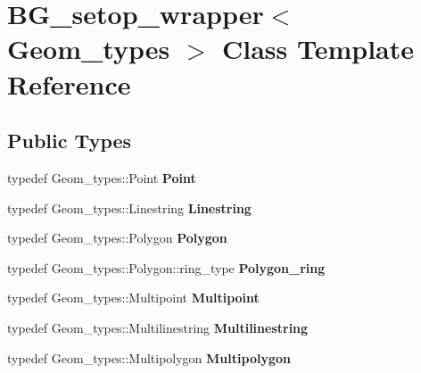 \hypertarget{classBG__setop__wrapper}{}\section{B\+G\+\_\+setop\+\_\+wrapper$<$ Geom\+\_\+types $>$ Class Template Reference}
\label{classBG__setop__wrapper}
\subsection*{Public Types}
\begin{DoxyCompactItemize}
\item 
\mbox{\label{classBG__setop__wrapper_a5c222ca45f10146f7c48b6494bc7c0bb}} 
typedef Geom\+\_\+types\+::\+Point {\bfseries Point}
\item 
\mbox{\label{classBG__setop__wrapper_afb2e227bd9ca8fa3a70a42f50165d0fd}} 
typedef Geom\+\_\+types\+::\+Linestring {\bfseries Linestring}
\item 
\mbox{\label{classBG__setop__wrapper_ad830ad863309a9feb0ab5a298dab143a}} 
typedef Geom\+\_\+types\+::\+Polygon {\bfseries Polygon}
\item 
\mbox{\label{classBG__setop__wrapper_a098cf9bed5f7257504bae4efa77561f4}} 
typedef Geom\+\_\+types\+::\+Polygon\+::ring\+\_\+type {\bfseries Polygon\+\_\+ring}
\item 
\mbox{\label{classBG__setop__wrapper_ae9fd7c2843adeb6cc6318e1d11df4477}} 
typedef Geom\+\_\+types\+::\+Multipoint {\bfseries Multipoint}
\item 
\mbox{\label{classBG__setop__wrapper_ac2bfdec8dc7a31ff2803dfd68646a98f}} 
typedef Geom\+\_\+types\+::\+Multilinestring {\bfseries Multilinestring}
\item 
\mbox{\label{classBG__setop__wrapper_a5b055e84113dc9d48e63c81c20711619}} 
typedef Geom\+\_\+types\+::\+Multipolygon {\bfseries Multipolygon}
\item 
\mbox{\label{classBG__setop__wrapper_abd54f35b7856111b941437633cb0d380}} 

\end{DoxyCompactItemize}
